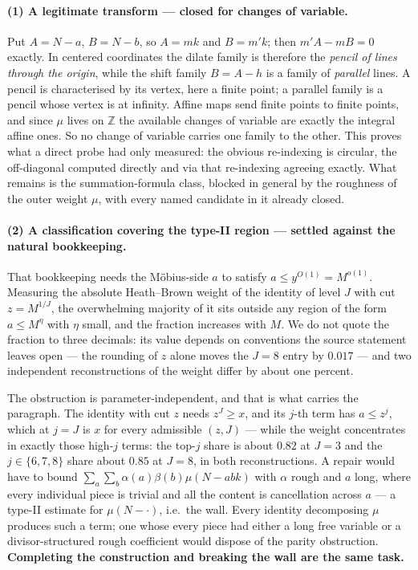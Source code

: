 \documentclass[11pt,a4paper]{article}
\theoremstyle{plain}
\theoremstyle{definition}
\begin{document}
\paragraph{(1) A legitimate transform --- closed for changes of
variable.} Put $A = N-a$, $B = N-b$, so $A = mk$ and $B = m'k$; then
$m'A - mB = 0$ exactly. In centered coordinates the dilate family is
therefore the \emph{pencil of lines through the origin}, while the
shift family $B = A - h$ is a family of \emph{parallel} lines. A
pencil is characterised by its vertex, here a finite point; a parallel
family is a pencil whose vertex is at infinity. Affine maps send
finite points to finite points, and since $\mu$ lives on $\mathbb Z$
the available changes of variable are exactly the integral affine
ones. So no change of variable carries one family to the other. This
proves what a direct probe had only measured: the obvious re-indexing
is circular, the off-diagonal computed directly and via that
re-indexing agreeing exactly. What remains is the summation-formula
class, blocked in general by the roughness of the outer weight $\mu$,
with every named candidate in it already closed.

\paragraph{(2) A classification covering the type-II region ---
settled against the natural bookkeeping.} That bookkeeping needs the
M\"obius-side $a$ to satisfy $a \le y^{O(1)} = M^{o(1)}$. Measuring the
absolute Heath--Brown weight of the identity of level $J$ with cut
$z = M^{1/J}$, the overwhelming majority of it sits outside any region
of the form $a \le M^{\eta}$ with $\eta$ small, and the fraction
increases with $M$. We do not quote the fraction to three decimals:
its value depends on conventions the source statement leaves open ---
the rounding of $z$ alone moves the $J=8$ entry by $0.017$ --- and two
independent reconstructions of the weight differ by about one percent.

The obstruction is parameter-independent, and that is what carries the
paragraph. The identity with cut $z$ needs $z^J \ge x$, and its $j$-th
term has $a \le z^j$, which at $j = J$ is $x$ for every admissible
$(z,J)$ --- while the weight concentrates in exactly those high-$j$
terms: the top-$j$ share is about $0.82$ at $J=3$ and the
$j\in\{6,7,8\}$ share about $0.85$ at $J=8$, in both reconstructions.
A repair would have to bound
$\sum_a\sum_b \alpha(a)\beta(b)\mu(N-abk)$ with $\alpha$ rough and $a$
long, where every individual piece is trivial and all the content is
cancellation across $a$ --- a type-II estimate for $\mu(N-\cdot)$,
i.e.\ the wall. Every identity decomposing $\mu$ produces such a term;
one whose every piece had either a long free variable or a
divisor-structured rough coefficient would dispose of the parity
obstruction. \textbf{Completing the construction and breaking the wall
are the same task.}
\end{document}
